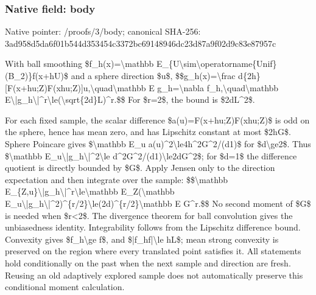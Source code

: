 \documentclass[10pt,a4paper]{article}
\begin{document}
\subsubsection{Native field: body}


Native pointer: /proofs/3/body; canonical SHA-256: 3ad958d5da6f01b544d35345\allowbreak{}4c3372bc69148946dc23d87a\allowbreak{}9f02d9c83e87957c


With ball smoothing \$f\_h(x)=\textbackslash{}mathbb E\_\{U\textbackslash{}sim\textbackslash{}operatorname\{Un\allowbreak{}if\}(B\_2)\}f(x+hU)\$ and a sphere direction \$u\$,
\$\$g\_h(x)=\textbackslash{}frac d\{2h\}[F(x+hu;Z)F(xhu;Z\allowbreak{})]u,\textbackslash{}quad\textbackslash{}mathbb E g\_h=\textbackslash{}nabla f\_h,\textbackslash{}quad\textbackslash{}mathbb E\textbackslash{}|g\_h\textbackslash{}|\textasciicircum{}r\textbackslash{}le(\textbackslash{}sqrt\{2d\}L)\textasciicircum{}r.\$\$
For \$r=2\$, the bound is \$2dL\textasciicircum{}2\$.

For each fixed sample, the scalar difference \$a(u)=F(x+hu;Z)F(xhu;Z)\$ is odd on the sphere, hence has mean zero, and has Lipschitz constant at most \$2hG\$. Sphere Poincare gives \$\textbackslash{}mathbb E\_u a(u)\textasciicircum{}2\textbackslash{}le4h\textasciicircum{}2G\textasciicircum{}2/(d1)\$ for \$d\textbackslash{}ge2\$. Thus \$\textbackslash{}mathbb E\_u\textbackslash{}|g\_h\textbackslash{}|\textasciicircum{}2\textbackslash{}le d\textasciicircum{}2G\textasciicircum{}2/(d1)\textbackslash{}le2dG\textasciicircum{}2\$; for \$d=1\$ the difference quotient is directly bounded by \$G\$. Apply Jensen only to the direction expectation and then integrate over the sample:
\$\$\textbackslash{}mathbb E\_\{Z,u\}\textbackslash{}|g\_h\textbackslash{}|\textasciicircum{}r\textbackslash{}le\textbackslash{}mathbb E\_Z(\textbackslash{}mathbb E\_u\textbackslash{}|g\_h\textbackslash{}|\textasciicircum{}2)\textasciicircum{}\{r/2\}\textbackslash{}le(2d)\textasciicircum{}\{r/2\}\textbackslash{}mathbb E G\textasciicircum{}r.\$\$
No second moment of \$G\$ is needed when \$r<2\$. The divergence theorem for ball convolution gives the unbiasedness identity. Integrability follows from the Lipschitz difference bound. Convexity gives \$f\_h\textbackslash{}ge f\$, and \$|f\_hf|\textbackslash{}le hL\$; mean strong convexity is preserved on the region where every translated point satisfies it. All statements hold conditionally on the past when the next sample and direction are fresh. Reusing an old adaptively explored sample does not automatically preserve this conditional moment calculation.
\end{document}
